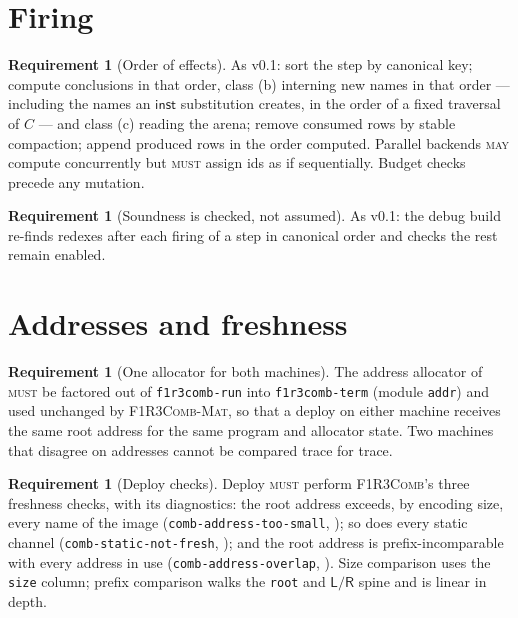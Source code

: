 \documentclass[11pt,a4paper]{article}
\newcommand{\code}[1]{\texttt{#1}}
\newcommand{\Comb}{\textsc{F1R3Comb}}
\newcommand{\Mat}{\textsc{F1R3Comb-Mat}}
\newcommand{\MUST}{\textsc{must}}
\newcommand{\MAY}{\textsc{may}}
\theoremstyle{definition}
\newtheorem{requirement}[definition]{Requirement}
\theoremstyle{plain}
\newcommand{\Lft}{\mathsf{L}}
\newcommand{\Rgt}{\mathsf{R}}
\newcommand{\inst}{\mathsf{inst}}
\begin{document}
\section{Firing}\label{sec:fire}

\begin{requirement}[Order of effects]\label{req:insertorder}
As v0.1: sort the step by canonical key; compute conclusions in that order,
class (b) interning new names in that order --- including the names an
$\inst$ substitution creates, in the order of a fixed traversal of $C$ ---
and class (c) reading the arena; remove consumed rows by stable compaction;
append produced rows in the order computed. Parallel backends \MAY{} compute
concurrently but \MUST{} assign ids as if sequentially. Budget checks precede
any mutation.
\end{requirement}

\begin{requirement}[Soundness is checked, not assumed]\label{req:soundcheck}
As v0.1: the debug build re-finds redexes after each firing of a step in
canonical order and checks the rest remain enabled.
\end{requirement}

\section{Addresses and freshness}\label{sec:addr}

\begin{requirement}[One allocator for both machines]\label{req:oneallocator}
The address allocator of \cite[Req.~9.5, Req.~5.23]{combspec} \MUST{} be
factored out of \code{f1r3comb-run} into \code{f1r3comb-term} (module
\code{addr}) and used unchanged by \Mat, so that a deploy on either machine
receives the same root address for the same program and allocator state. Two
machines that disagree on addresses cannot be compared trace for trace.
\end{requirement}

\begin{requirement}[Deploy checks]\label{req:deploychecks}
Deploy \MUST{} perform \Comb's three freshness checks, with its diagnostics:
the root address exceeds, by encoding size, every name of the image
(\code{comb-address-too-small}, \cite[Req.~5.19]{combspec}); so does every
static channel (\code{comb-static-not-fresh}, \cite[Req.~5.22]{combspec});
and the root address is prefix-incomparable with every address in use
(\code{comb-address-overlap}, \cite[Req.~5.23]{combspec}). Size comparison
uses the \code{size} column; prefix comparison walks the \code{root} and
$\Lft/\Rgt$ spine and is linear in depth.
\end{requirement}
\end{document}
